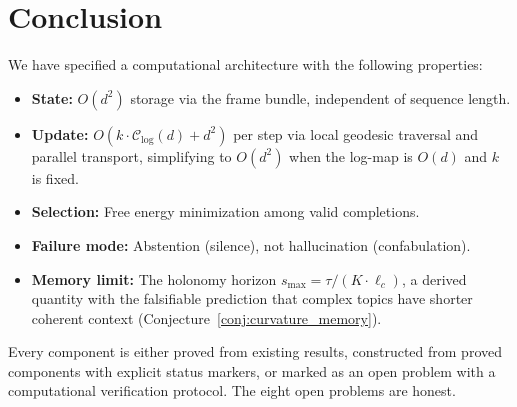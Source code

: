 \documentclass[11pt,a4paper]{article}
\theoremstyle{definition}
\theoremstyle{remark}
\begin{document}
\section{Conclusion}\label{sec:conclusion}

We have specified a computational architecture with the following 
properties:
\begin{itemize}[nosep]
    \item \textbf{State:} $O(d^2)$ storage via the frame bundle, 
    independent of sequence length.
    \item \textbf{Update:} $O(k \cdot \mathcal{C}_{\log}(d) + d^2)$ 
    per step via local geodesic traversal and parallel transport, 
    simplifying to $O(d^2)$ when the log-map is $O(d)$ and $k$ 
    is fixed.
    \item \textbf{Selection:} Free energy minimization among valid 
    completions.
    \item \textbf{Failure mode:} Abstention (silence), not 
    hallucination (confabulation).
    \item \textbf{Memory limit:} The holonomy horizon 
    $s_{\max} = \tau/(K \cdot \ell_c)$, a derived quantity with 
    the falsifiable prediction that complex topics have shorter 
    coherent context (Conjecture~\ref{conj:curvature_memory}).
\end{itemize}

Every component is either proved from existing results, 
constructed from proved components with explicit status markers, 
or marked as an open problem with a computational verification 
protocol. The eight open problems are honest.

\medskip
\end{document}
